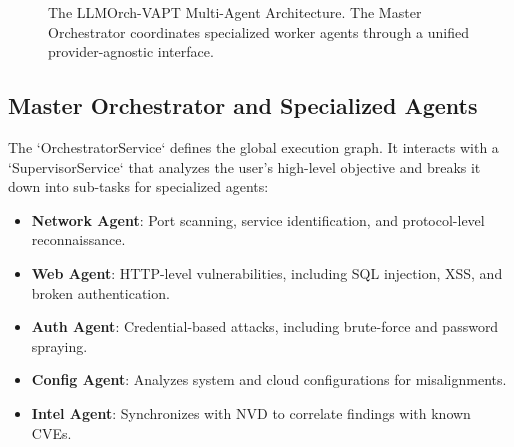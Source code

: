 \documentclass[conference,compsoc]{IEEEtran}
\begin{document}
\begin{figure}[htbp]
\centering
{}
\caption{The LLMOrch-VAPT Multi-Agent Architecture. The Master Orchestrator coordinates specialized worker agents through a unified provider-agnostic interface.}
\label{fig:arch}
\end{figure}

\subsection{Master Orchestrator and Specialized Agents}
The `OrchestratorService` defines the global execution graph. It interacts with a `SupervisorService` that analyzes the user's high-level objective and breaks it down into sub-tasks for specialized agents:
\begin{itemize}
    \item \textbf{Network Agent}: Port scanning, service identification, and protocol-level reconnaissance.
    \item \textbf{Web Agent}: HTTP-level vulnerabilities, including SQL injection, XSS, and broken authentication.
    \item \textbf{Auth Agent}: Credential-based attacks, including brute-force and password spraying.
    \item \textbf{Config Agent}: Analyzes system and cloud configurations for misalignments.
    \item \textbf{Intel Agent}: Synchronizes with NVD \cite{nvd} to correlate findings with known CVEs.
\end{itemize}
\end{document}
